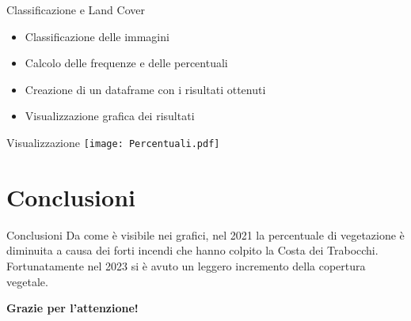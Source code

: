 \documentclass{beamer}
\begin{document}
\begin{frame}{Classificazione e Land Cover}
\begin{itemize}
    \item Classificazione delle immagini
    \item \pause Calcolo delle frequenze e delle percentuali
    \item \pause Creazione di un dataframe con i risultati ottenuti
    \item \pause Visualizzazione grafica dei risultati
\end{itemize}
\end{frame}

\begin{frame}{Visualizzazione}
    \texttt{[image: Percentuali.pdf]}
\end{frame}

\section{Conclusioni}

\begin{frame}{Conclusioni}
Da come è visibile nei grafici, nel 2021 la percentuale di vegetazione è diminuita a causa dei forti incendi che hanno colpito la Costa dei Trabocchi. Fortunatamente nel 2023 si è avuto un leggero incremento della copertura vegetale. 
\end{frame}

\begin{frame}{}
    \centering \textbf{\LARGE Grazie per l'attenzione!}
\end{frame}
\end{document}
